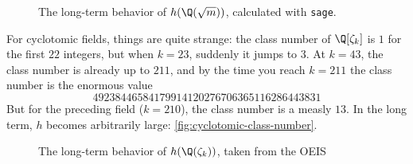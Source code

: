 \begin{figure}[h]
    \caption{The long-term behavior of $h(\Q(\sqrt{m}))$, calculated with \texttt{sage}.}
    \label{fig:real-quadratic-class-number}
\end{figure}

For cyclotomic fields, things are quite strange: the class number of $\Q[\zeta_k]$ is $1$ for the first $22$ integers, but when $k = 23$, suddenly it jumps to $3$. At $k = 43$, the class number is already up to $211$, and by the time you reach $k = 211$ the class number is the enormous value
$$
    49238446584179914120276706365116286443831
$$
But for the preceding field ($k = 210$), the class number is a measly $13$. In the long term, $h$ becomes arbitrarily large: \autoref{fig:cyclotomic-class-number}.

\begin{figure}[h]
    \caption{The long-term behavior of $h(\Q(\zeta_k))$, taken from the OEIS \cite[A061653]{oeis}}
    \label{fig:cyclotomic-class-number}
\end{figure}

